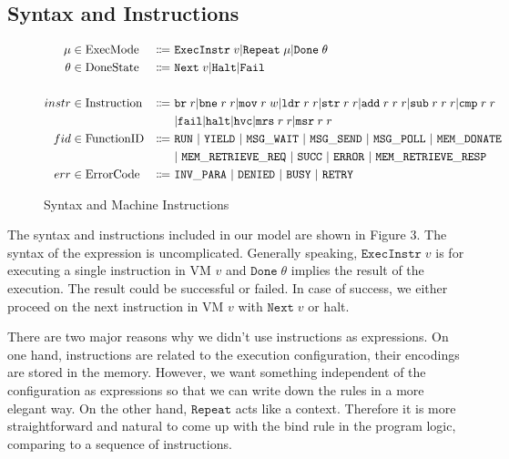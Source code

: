 \documentclass[a4paper]{article}
\newcommand*{\derived}{\Coloneqq\ }
\newcommand*{\MODE}{\text{ExecMode}}
\newcommand*{\DONE}{\text{DoneState}}
\newcommand*{\INSTR}{\text{Instruction}}
\newcommand*{\instrm}[1]{\mathtt{#1}}
\newcommand*{\EI}[1]{\mathtt{ExecInstr} \; {#1}}
\newcommand*{\DN}[1]{\mathtt{Done} \; {#1}}
\newcommand*{\NXT}[1]{\mathtt{Next} \; {#1}}
\begin{document}
\subsection{Syntax and Instructions}
\begin{figure}[h!]
  \begin{align*}
    \mu &\in \MODE &\derived & \mathtt{ExecInstr} \; v | \mathtt{Repeat} \; \mu | \mathtt{Done} \; \theta \\
    \theta &\in \DONE &\derived & \NXT{v} | \mathtt{Halt} | \mathtt{Fail}\\
    \\
    instr & \in  \INSTR &\derived & \instrm{br} \; r |\instrm{bne} \; r \; r |
                                    \instrm{mov} \; r \; w | \instrm{ldr} \; r\; r|
                                    \instrm{str} \; r \; r | \instrm{add} \; r \; r \; r |
                                    \instrm{sub} \; r \; r \; r | \instrm{cmp} \; r \; r \\
        & & & | \instrm{fail} | \instrm{halt} | \instrm{hvc} |\instrm{mrs} \; r\;r | \instrm{msr} \; r \; r\\
    fid & \in \text{FunctionID} &\derived & \tt{RUN} ~|~\tt{YIELD} ~|~\tt{MSG\_WAIT} ~|~\tt{MSG\_SEND}
                                            ~|~\tt{MSG\_POLL}~|~\tt{MEM\_DONATE}\\
    &&&|~\tt{MEM\_RETRIEVE\_REQ} ~|~ \tt{SUCC} ~|~\tt{ERROR}~|~\tt{MEM\_RETRIEVE\_RESP}\\
    err & \in \text{ErrorCode} &\derived & \tt{INV\_PARA} ~|~\tt{DENIED} ~|~\tt{BUSY}~|~\tt{RETRY}
  \end{align*}
  \caption{Syntax and Machine Instructions}
\end{figure}
The syntax and instructions included in our model are shown in Figure 3. The
syntax of the expression is uncomplicated. Generally speaking, $\EI{v}$ is for
executing a single instruction in VM $v$ and $\DN{\theta}$ implies the result of
the execution. The result could be successful or failed. In case of success, we
either proceed on the next instruction in VM $v$ with $\NXT{v}$ or halt.

There are two major reasons why we didn't use instructions as expressions. On
one hand,
instructions are related to the execution configuration, their encodings are
stored in the memory. However, we want something independent of the
configuration as expressions so that we can write down the rules in a more
elegant way. On the other hand, $\mathtt{Repeat}$ acts like a context.
Therefore it is more straightforward and natural to come up with the bind rule
in the program logic, comparing to a sequence of instructions.
\end{document}
